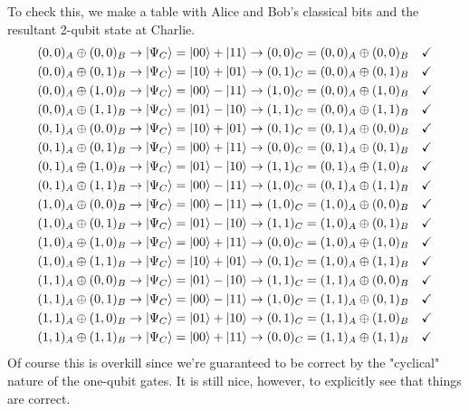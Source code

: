 \documentclass{article}
\theoremstyle{definition}
\begin{document}
To check this, we make a table with Alice and Bob's classical bits and the resultant 2-qubit state at Charlie. 
\begin{align*}
	&(0,0)_A \oplus (0,0)_B \to \ket{\Psi_C} = \ket{00} + \ket{11} \to (0,0)_C = (0,0)_A \oplus (0,0)_B \quad\checkmark\\
	&(0,0)_A \oplus (0,1)_B \to \ket{\Psi_C} = \ket{10} + \ket{01} \to (0,1)_C = (0,0)_A \oplus (0,1)_B \quad\checkmark\\
	&(0,0)_A \oplus (1,0)_B \to \ket{\Psi_C} = \ket{00} - \ket{11} \to (1,0)_C = (0,0)_A \oplus (1,0)_B \quad\checkmark\\
	&(0,0)_A \oplus (1,1)_B \to \ket{\Psi_C} = \ket{01} - \ket{10} \to (1,1)_C = (0,0)_A \oplus (1,1)_B \quad\checkmark\\
	&(0,1)_A \oplus (0,0)_B \to \ket{\Psi_C} = \ket{10} + \ket{01} \to (0,1)_C = (0,1)_A \oplus (0,0)_B \quad\checkmark\\
	&(0,1)_A \oplus (0,1)_B \to \ket{\Psi_C} = \ket{00} + \ket{11} \to (0,0)_C = (0,1)_A \oplus (0,1)_B \quad\checkmark\\
	&(0,1)_A \oplus (1,0)_B \to \ket{\Psi_C} = \ket{01} - \ket{10} \to (1,1)_C = (0,1)_A \oplus (1,0)_B \quad\checkmark\\
	&(0,1)_A \oplus (1,1)_B \to \ket{\Psi_C} = \ket{00} - \ket{11} \to (1,0)_C = (0,1)_A \oplus (1,1)_B \quad\checkmark\\
	&(1,0)_A \oplus (0,0)_B \to \ket{\Psi_C} = \ket{00} - \ket{11} \to (1,0)_C = (1,0)_A \oplus (0,0)_B \quad\checkmark\\
	&(1,0)_A \oplus (0,1)_B \to \ket{\Psi_C} = \ket{01} - \ket{10} \to (1,1)_C = (1,0)_A \oplus (0,1)_B \quad\checkmark\\
	&(1,0)_A \oplus (1,0)_B \to \ket{\Psi_C} = \ket{00} + \ket{11} \to (0,0)_C = (1,0)_A \oplus (1,0)_B \quad\checkmark\\
	&(1,0)_A \oplus (1,1)_B \to \ket{\Psi_C} = \ket{10} + \ket{01} \to (0,1)_C = (1,0)_A \oplus (1,1)_B \quad\checkmark\\
	&(1,1)_A \oplus (0,0)_B \to \ket{\Psi_C} = \ket{01} - \ket{10} \to (1,1)_C = (1,1)_A \oplus (0,0)_B \quad\checkmark\\
	&(1,1)_A \oplus (0,1)_B \to \ket{\Psi_C} = \ket{00} - \ket{11} \to (1,0)_C = (1,1)_A \oplus (0,1)_B \quad\checkmark\\
	&(1,1)_A \oplus (1,0)_B \to \ket{\Psi_C} = \ket{01} + \ket{10} \to (0,1)_C = (1,1)_A \oplus (1,0)_B \quad\checkmark\\
	&(1,1)_A \oplus (1,1)_B \to \ket{\Psi_C} = \ket{00} + \ket{11} \to (0,0)_C = (1,1)_A \oplus (1,1)_B \quad\checkmark
\end{align*}
Of course this is overkill since we're guaranteed to be correct by the "cyclical" nature of the one-qubit gates. It is still nice, however, to explicitly see that things are correct. \\
\end{document}
